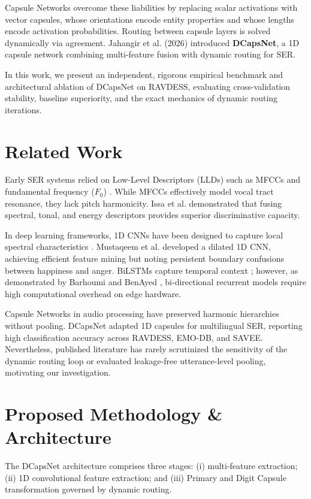 \documentclass[twocolumn]{article}
\begin{document}
Capsule Networks \cite{sabour2017, hinton2018} overcome these liabilities by replacing scalar activations with vector capsules, whose orientations encode entity properties and whose lengths encode activation probabilities. Routing between capsule layers is solved dynamically via agreement. Jahangir et al. (2026) \cite{jahangir2026} introduced \textbf{DCapsNet}, a 1D capsule network combining multi-feature fusion with dynamic routing for SER.

In this work, we present an independent, rigorous empirical benchmark and architectural ablation of DCapsNet on RAVDESS, evaluating cross-validation stability, baseline superiority, and the exact mechanics of dynamic routing iterations.

\section{Related Work}
Early SER systems relied on Low-Level Descriptors (LLDs) such as MFCCs and fundamental frequency ($F_0$) \cite{eyben2010}. While MFCCs effectively model vocal tract resonance, they lack pitch harmonicity. Issa et al. \cite{farooq2020} demonstrated that fusing spectral, tonal, and energy descriptors provides superior discriminative capacity.

In deep learning frameworks, 1D CNNs have been designed to capture local spectral characteristics \cite{yang2024, agrawal2025}. Mustaqeem et al. \cite{mustaqeem2021} developed a dilated 1D CNN, achieving efficient feature mining but noting persistent boundary confusions between happiness and anger. BiLSTMs capture temporal context \cite{mustaqeem2020, li2021}; however, as demonstrated by Barhoumi and BenAyed \cite{barhoumi2024}, bi-directional recurrent models require high computational overhead on edge hardware.

Capsule Networks in audio processing \cite{wu2021} have preserved harmonic hierarchies without pooling. DCapsNet \cite{jahangir2026} adapted 1D capsules for multilingual SER, reporting high classification accuracy across RAVDESS, EMO-DB, and SAVEE. Nevertheless, published literature has rarely scrutinized the sensitivity of the dynamic routing loop or evaluated leakage-free utterance-level pooling, motivating our investigation.

\section{Proposed Methodology \& Architecture}
The DCapsNet architecture comprises three stages: (i) multi-feature extraction; (ii) 1D convolutional feature extraction; and (iii) Primary and Digit Capsule transformation governed by dynamic routing.
\end{document}

